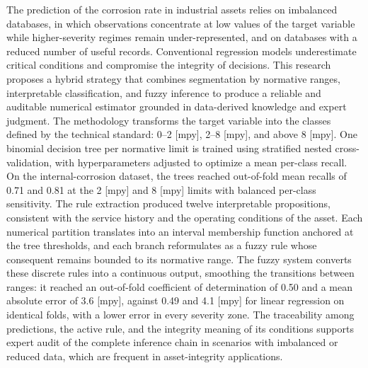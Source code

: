 The prediction of the corrosion rate in industrial assets relies on imbalanced databases, in which observations concentrate at low values of the target variable while higher-severity regimes remain under-represented, and on databases with a reduced number of useful records. Conventional regression models underestimate critical conditions and compromise the integrity of decisions. This research proposes a hybrid strategy that combines segmentation by normative ranges, interpretable classification, and fuzzy inference to produce a reliable and auditable numerical estimator grounded in data-derived knowledge and expert judgment. The methodology transforms the target variable into the classes defined by the technical standard: 0--2 [mpy], 2--8 [mpy], and above 8 [mpy]. One binomial decision tree per normative limit is trained using stratified nested cross-validation, with hyperparameters adjusted to optimize a mean per-class recall.  On the internal-corrosion dataset, the trees reached out-of-fold mean recalls of 0.71 and 0.81 at the 2 [mpy] and 8 [mpy] limits with balanced per-class sensitivity. The rule extraction produced twelve interpretable propositions, consistent with the service history and the operating conditions of the asset. Each numerical partition translates into an interval membership function anchored at the tree thresholds, and each branch reformulates as a fuzzy rule whose consequent remains bounded to its normative range. The fuzzy system converts these discrete rules into a continuous output, smoothing the transitions between ranges: it reached an out-of-fold coefficient of determination of 0.50 and a mean absolute error of 3.6 [mpy], against 0.49 and 4.1 [mpy] for linear regression on identical folds, with a lower error in every severity zone. The traceability among predictions, the active rule, and the integrity meaning of its conditions supports expert audit of the complete inference chain in scenarios with imbalanced or reduced data, which are frequent in asset-integrity applications.  